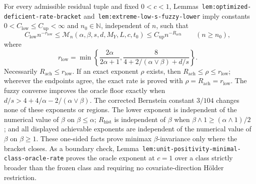 For every admissible residual tuple and fixed \(0<c<1\), Lemmas~\texttt{lem:optimized-deficient-rate-bracket} and~\texttt{lem:extreme-low-s-fuzzy-lower} imply constants \(0<C_{\mathrm{low}}\le C_{\mathrm{up}}<\infty\) and \(n_0\in\mathbb N\), independent of \(n\), such that
\[
C_{\mathrm{low}}n^{-r_{\mathrm{low}}}
\le
\mathcal M_n(\alpha,\beta,s,d,M_Y,L,c,t_0)
\le
C_{\mathrm{up}}n^{-R_{\mathrm{ach}}}
\qquad(n\ge n_0),
\]
where
\[
r_{\mathrm{low}}
=
\min\left\{
\frac{2\alpha}{2\alpha+1},
\frac{8}{4+2/(\alpha\vee\beta)+d/s}
\right\}.
\]
Necessarily \(R_{\mathrm{ach}}\le r_{\mathrm{low}}\). If an exact exponent \(\rho\) exists, then \(R_{\mathrm{ach}}\le\rho\le r_{\mathrm{low}}\); wherever the endpoints agree, the exact rate is proved with \(\rho=R_{\mathrm{ach}}=r_{\mathrm{low}}\). The fuzzy converse improves the oracle floor exactly when \(d/s>4+4/\alpha-2/(\alpha\vee\beta)\). The corrected Bernstein constant \(3/104\) changes none of these exponents or regions. The lower exponent is independent of the numerical value of \(\beta\) on \(\beta\le\alpha\); \(R_{\mathrm{hist}}\) is independent of \(\beta\) when \(\beta\wedge1\ge(\alpha\wedge1)/2\); and all displayed achievable exponents are independent of the numerical value of \(\beta\) on \(\beta\ge1\). These one-sided facts prove minimax \(\beta\)-invariance only where the bracket closes. As a boundary check, Lemma~\texttt{lem:unit-positivity-minimal-class-oracle-rate} proves the oracle exponent at \(c=1\) over a class strictly broader than the frozen class and requiring no covariate-direction H\"older restriction.